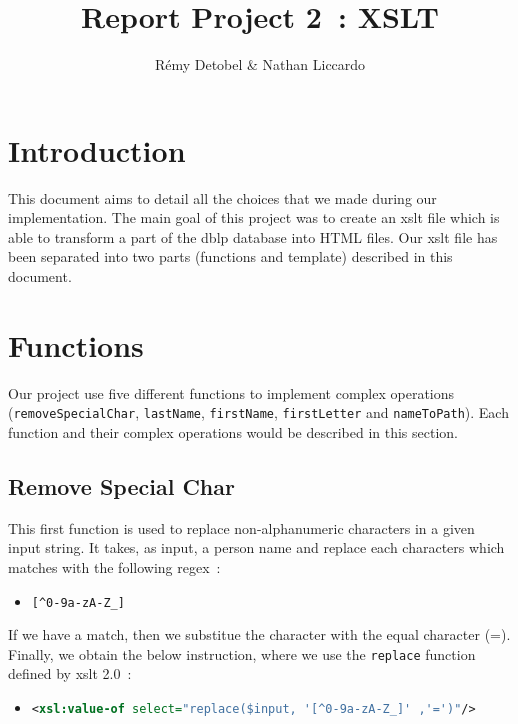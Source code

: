 \documentclass{article}
\author{R\'emy Detobel \& Nathan Liccardo}
\title{Report Project 2~: XSLT}
\begin{document}
\maketitle

\section{Introduction}
  This document aims to detail all the choices that we made during our implementation. The main goal of this project was to create an xslt file which is able to transform a part of the dblp database into HTML files. Our xslt file has been separated into two parts (functions and template) described in this document.

\section{Functions}
  Our project use five different functions to implement complex operations (\verb|removeSpecialChar|, \verb|lastName|, \verb|firstName|, \verb|firstLetter| and \verb|nameToPath|). Each function and their complex operations would be described in this section.

  \subsection{Remove Special Char} 
    This first function is used to replace non-alphanumeric characters in a given input string. It takes, as input, a person name and replace each characters which matches with the following regex~:
    \begin{itemize}
      \item \verb|[^0-9a-zA-Z_]|
    \end{itemize} 
    If we have a match, then we substitue the character with the equal character (=). Finally, we obtain the below instruction, where we use the \verb|replace| function defined by xslt 2.0~:
    \begin{itemize}
      \item \begin{lstlisting}[language=XML]
<xsl:value-of select="replace($input, '[^0-9a-zA-Z_]' ,'=')"/>\end{lstlisting}
    \end{itemize}
\end{document}

